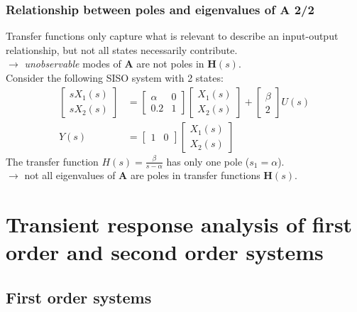 \begin{frame}
\frametitle{Relationship between poles and eigenvalues of $\mathbf{A}$ 2/2}
Transfer functions only capture what is relevant to describe an input-output relationship, but not all states necessarily contribute.\pause\\
$\rightarrow$ \emph{unobservable} modes of $\mathbf{A}$ are not poles in $\mathbf{H}(s)$. \\
Consider the following SISO system with 2 states:
\begin{align*}
\begin{bmatrix} sX_1(s) \\ sX_2(s) \end{bmatrix} &= \begin{bmatrix} \alpha & 0 \\ 0.2 & 1 \end{bmatrix} \begin{bmatrix} X_1(s) \\ X_2(s) \end{bmatrix} + \begin{bmatrix} \beta \\ 2 \end{bmatrix} U(s) \\
Y(s) &= \begin{bmatrix} 1 & 0 \end{bmatrix} \begin{bmatrix} X_1(s) \\ X_2(s) \end{bmatrix}
\end{align*}
The transfer function $H(s) = \frac{\beta}{s-\alpha}$ has only one pole ($s_1 = \alpha$). \\
$\rightarrow$ {\color{blue}not all eigenvalues of $\mathbf{A}$ are poles in transfer functions $\mathbf{H}(s)$.}
\end{frame}


\section{Transient response analysis of first order and second order systems}

\subsection{First order systems}

